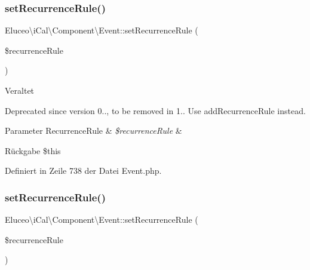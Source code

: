 \subsubsection{\texorpdfstring{set\+Recurrence\+Rule()}{setRecurrenceRule()}\hspace{0.1cm}{\footnotesize\ttfamily [2/3]}}
{\footnotesize\ttfamily Eluceo\textbackslash{}i\+Cal\textbackslash{}\+Component\textbackslash{}\+Event\+::set\+Recurrence\+Rule (\begin{DoxyParamCaption}\item[{\mbox{\hyperlink{class_eluceo_1_1i_cal_1_1_property_1_1_event_1_1_recurrence_rule}{Recurrence\+Rule}}}]{\$recurrence\+Rule }\end{DoxyParamCaption})}

\begin{DoxyRefDesc}{Veraltet}
\item[\mbox{\hyperlink{deprecated__deprecated000005}{Veraltet}}]Deprecated since version 0.., to be removed in 1.. Use add\+Recurrence\+Rule instead.\end{DoxyRefDesc}



\begin{DoxyParams}[1]{Parameter}
Recurrence\+Rule & {\em \$recurrence\+Rule} & \\
\hline
\end{DoxyParams}
\begin{DoxyReturn}{Rückgabe}
\$this 
\end{DoxyReturn}


Definiert in Zeile 738 der Datei Event.\+php.

\mbox{\label{class_eluceo_1_1i_cal_1_1_component_1_1_event_a8301adc5310ee5a3281f40599607c86d}} 
\subsubsection{\texorpdfstring{set\+Recurrence\+Rule()}{setRecurrenceRule()}\hspace{0.1cm}{\footnotesize\ttfamily [3/3]}}
{\footnotesize\ttfamily Eluceo\textbackslash{}i\+Cal\textbackslash{}\+Component\textbackslash{}\+Event\+::set\+Recurrence\+Rule (\begin{DoxyParamCaption}\item[{\mbox{\hyperlink{class_eluceo_1_1i_cal_1_1_property_1_1_event_1_1_recurrence_rule}{Recurrence\+Rule}}}]{\$recurrence\+Rule }\end{DoxyParamCaption})}

